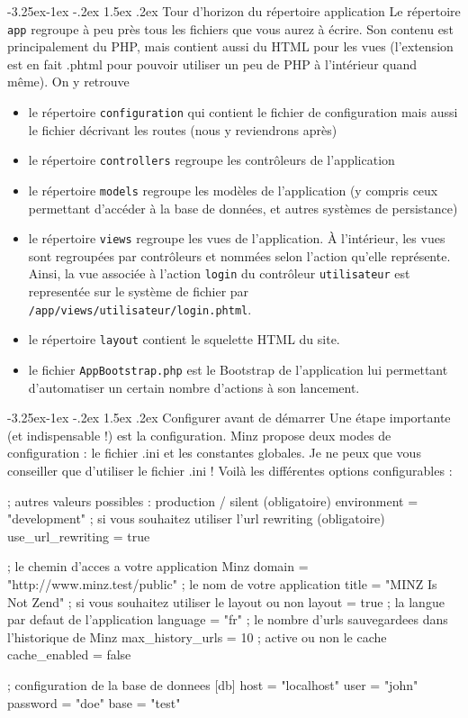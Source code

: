 \documentclass[a4paper,11pt]{article}
\makeatletter
\renewcommand{\subsection}{\@startsection{subsection}{2}{\z@}%
             {-3.25ex\@plus -1ex \@minus -.2ex}%
             {1.5ex \@plus .2ex}%
             {\color{bleuFonce}\normalfont\large\bfseries}}
\makeatother
\begin{document}
\subsection{Tour d'horizon du répertoire application}
Le répertoire \texttt{app} regroupe à peu près tous les fichiers que vous aurez à écrire. Son contenu est principalement du PHP, mais contient aussi du HTML pour les vues (l'extension est en fait .phtml pour pouvoir utiliser un peu de PHP à l'intérieur quand même). On y retrouve
\begin{itemize}
  \item le répertoire \texttt{configuration} qui contient le fichier de configuration mais aussi le fichier décrivant les routes (nous y reviendrons après)
  \item le répertoire \texttt{controllers} regroupe les contrôleurs de l'application
  \item le répertoire \texttt{models} regroupe les modèles de l'application (y compris ceux permettant d'accéder à la base de données, et autres systèmes de persistance)
  \item le répertoire \texttt{views} regroupe les vues de l'application. À l'intérieur, les vues sont regroupées par contrôleurs et nommées selon l'action qu'elle représente. Ainsi, la vue associée à l'action \texttt{login} du contrôleur \texttt{utilisateur} est representée sur le système de fichier par\\\texttt{/app/views/utilisateur/login.phtml}.
  \item le répertoire \texttt{layout} contient le squelette HTML du site.
  \item le fichier \texttt{AppBootstrap.php} est le Bootstrap de l'application lui permettant d'automatiser un certain nombre d'actions à son lancement.
\end{itemize}

\subsection{Configurer avant de démarrer}
Une étape importante (et indispensable !) est la configuration. Minz propose deux modes de configuration : le fichier .ini et les constantes globales. Je ne peux que vous conseiller que d'utiliser le fichier .ini ! Voilà les différentes options configurables :
\begin{ini}
[general]
; autres valeurs possibles : production / silent (obligatoire)
environment = "development"
; si vous souhaitez utiliser l'url rewriting (obligatoire)
use_url_rewriting = true

; le chemin d'acces a votre application Minz
domain = "http://www.minz.test/public"
; le nom de votre application
title = "MINZ Is Not Zend"
; si vous souhaitez utiliser le layout ou non
layout = true
; la langue par defaut de l'application
language = "fr"
; le nombre d'urls sauvegardees dans l'historique de Minz
max_history_urls = 10
; active ou non le cache
cache_enabled = false

; configuration de la base de donnees
[db]
host = "localhost"
user = "john"
password = "doe"
base = "test"
\end{ini}
\end{document}
